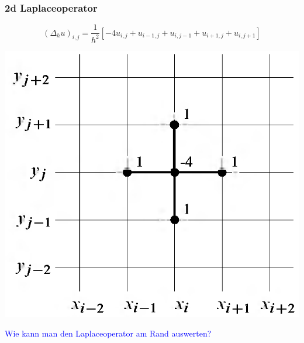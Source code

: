\documentclass[10pt]{beamer}
\begin{document}
\frame
{
\frametitle{2d Laplaceoperator}

\begin{equation}
(\Delta_h u)_{i,j} = \frac{1}{h^2} \left[ -4 u_{i,j} + u_{i-1,j} + u_{i,j-1} + u_{i+1,j} + u_{i,j+1} \right]\nonumber
\end{equation}
\begin{center}
 \includegraphics[scale=0.25]{img/gitter3.png}
\end{center}
\textcolor{blue} {Wie kann man den Laplaceoperator am Rand auswerten?}
}
\end{document}
